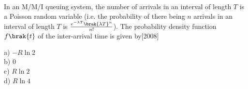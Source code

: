 \item In an M/M/I queuing system, the number of arrivals in an interval of length $T$ is a Poisson random variable (i.e. the probability of there being $n$ arrivals in an interval of length $T$ is $\frac{e^{-\lambda T}\brak{\lambda T}^n}{n!}$). The probability density function $f\brak{t}$ of the inter-arrival time is given by\hfill{[2008]}
\begin{multicols}{4}
     a) $-R\ln{2}$\\
     b) 0\\
     c) $R\ln{2}$\\
     d) $R \ln{4}$
 \end{multicols}


